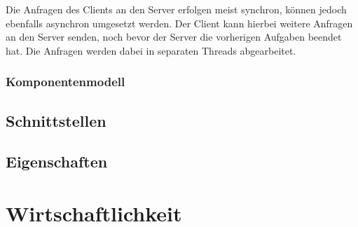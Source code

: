 Die Anfragen des Clients an den Server erfolgen meist synchron, können jedoch ebenfalls asynchron umgesetzt werden. \cite{schill:2012}
Der Client kann hierbei weitere Anfragen an den Server senden, noch bevor der Server die vorherigen Aufgaben beendet hat. Die Anfragen werden dabei in separaten Threads abgearbeitet. \cite{abts:2019}

\subsubsection{Komponentenmodell}

\subsection{Schnittstellen}

\subsection{Eigenschaften}

\section{Wirtschaftlichkeit}
